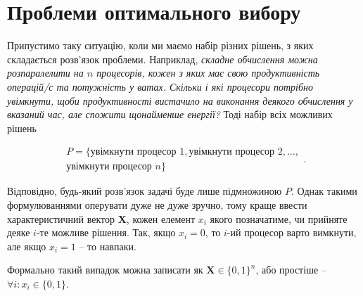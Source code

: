 \documentclass[\main/book.tex]{subfiles}
\begin{document}
\section{Проблеми оптимального вибору}
\label{section:linear:x_in_0-1}

Припустимо таку ситуацію, коли ми маємо набір різних рішень, з яких складається розв'язок проблеми. Наприклад, \textit{складне обчислення можна розпаралелити на $n$ процесорів, кожен з яких має свою продуктивність операцій/с та потужність у ватах. Скільки і які процесори потрібно увімкнути, щоби продуктивності вистачило на виконання деякого обчислення у вказаний час, але спожити щонайменше енергії?} Тоді набір всіх можливих рішень

\[
\begin{split}
P = \{
 \text{увімкнути процесор 1},
 \text{увімкнути процесор 2},
 \ldots, \\
 \text{увімкнути процесор $n$}
\}
\end{split}
.
\]

Відповідно, будь-який розв'язок задачі буде лише підмножиною $P$. Однак такими формулюваннями оперувати дуже не дуже зручно, тому краще ввести характеристичний вектор $\mathbf{X}$, кожен елемент $x_i$ якого позначатиме, чи прийняте деяке $i$-те можливе рішення. Так, якщо $x_i=0$, то $i$-ий процесор варто вимкнути, але якщо $x_i=1$ -- то навпаки.

\begin{note}
 Формально такий випадок можна записати як $\mathbf{X} \in \{0, 1\}^{n}$, або простіше -- $\forall i: x_i \in \{0, 1\}$.
\end{note}
\end{document}

